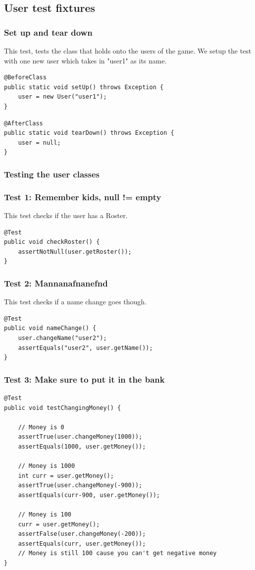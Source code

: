 \documentclass{article}
\begin{document}
\subsection{User test fixtures}
\subsubsection{Set up and tear down}
This test, tests the class that holds onto the users of the game. We setup the test with one new user which takes in "user1" as its name.

\begin{lstlisting}
@BeforeClass
public static void setUp() throws Exception {
	user = new User("user1");
}
\end{lstlisting}

\begin{lstlisting}
@AfterClass
public static void tearDown() throws Exception {
	user = null;
}
\end{lstlisting}

\subsubsection{Testing the user classes}
\subsubsection*{Test 1: Remember kids, null != empty}
This test checks if the user has a Roster.
\begin{lstlisting}
@Test
public void checkRoster() {
	assertNotNull(user.getRoster());
}

\end{lstlisting}
\subsubsection*{Test 2: Mannanafnanefnd}
This test checks if a name change goes though.
\begin{lstlisting}
@Test 
public void nameChange() {
	user.changeName("user2");
	assertEquals("user2", user.getName());
}
\end{lstlisting}
\subsubsection*{Test 3: Make sure to put it in the bank}
\begin{lstlisting}
@Test
public void testChangingMoney() {
	
	// Money is 0
	assertTrue(user.changeMoney(1000));
	assertEquals(1000, user.getMoney());
	
	// Money is 1000
	int curr = user.getMoney();
	assertTrue(user.changeMoney(-900));
	assertEquals(curr-900, user.getMoney());
	
	// Money is 100
	curr = user.getMoney();
	assertFalse(user.changeMoney(-200));
	assertEquals(curr, user.getMoney());
	// Money is still 100 cause you can't get negative money
}
\end{lstlisting}
\end{document}
